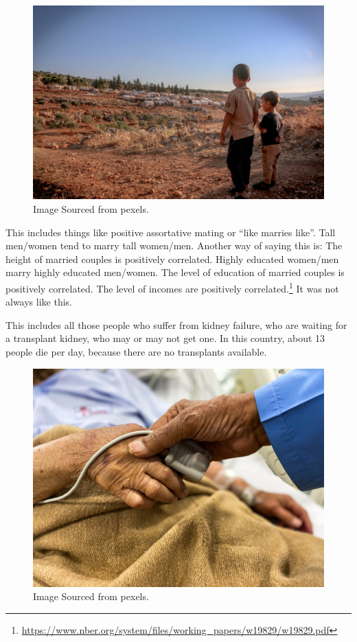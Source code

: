 \documentclass[
]{book}
\begin{document}
\begin{figure}

{\centering \includegraphics[width=0.7\linewidth]{img/intro/refugees} 

}

\caption{Image Sourced from pexels.}\label{fig:introrefugees}
\end{figure}

This includes things like positive assortative mating or ``like marries like''. Tall men/women tend to marry tall women/men. Another way of saying this is: The height of married couples is positively correlated. Highly educated women/men marry highly educated men/women. The level of education of married couples is positively correlated. The level of incomes are positively correlated.\footnote{\url{https://www.nber.org/system/files/working_papers/w19829/w19829.pdf}} It was not always like this.

This includes all those people who suffer from kidney failure, who are waiting for a transplant kidney, who may or may not get one. In this country, about 13 people die per day, because there are no transplants available.

\begin{figure}

{\centering \includegraphics[width=0.6\linewidth]{img/intro/kidneyfailure} 

}

\caption{Image Sourced from pexels.}\label{fig:introkidneyfailure}
\end{figure}
\end{document}
